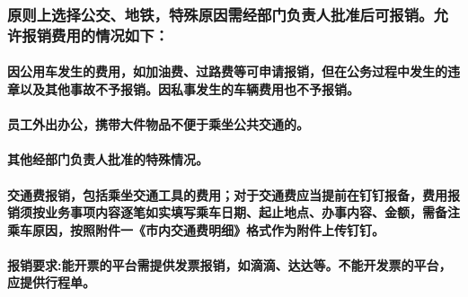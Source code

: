 \documentclass[16pt]{article}
\begin{document}
\subsubsection{原则上选择公交、地铁，特殊原因需经部门负责人批准后可报销。允许报销费用的情况如下：}
\paragraph{因公用车发生的费用，如加油费、过路费等可申请报销，但在公务过程中发生的违章以及其他事故不予报销。因私事发生的车辆费用也不予报销。}
\paragraph{员工外出办公，携带大件物品不便于乘坐公共交通的。}
\paragraph{其他经部门负责人批准的特殊情况。}
\paragraph{交通费报销，包括乘坐交通工具的费用；对于交通费应当提前在钉钉报备，费用报销须按业务事项内容逐笔如实填写乘车日期、起止地点、办事内容、金额，需备注乘车原因，按照附件一《市内交通费明细》格式作为附件上传钉钉。}
\paragraph{报销要求:能开票的平台需提供发票报销，如滴滴、达达等。不能开发票的平台，应提供行程单。}

\end{document}
